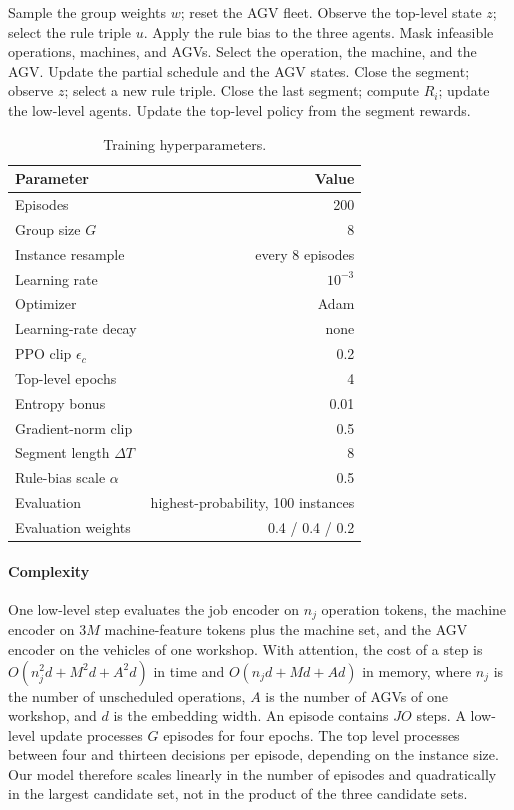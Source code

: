\begin{algorithm}[t]
\caption{One training episode}
\label{alg:train}
\begin{algorithmic}[1]
\State Sample the group weights $w$; reset the AGV fleet.
\State Observe the top-level state $z$; select the rule triple $u$.
    \State Apply the rule bias to the three agents.
    \State Mask infeasible operations, machines, and AGVs.
    \State Select the operation, the machine, and the AGV.
    \State Update the partial schedule and the AGV states.
        \State Close the segment; observe $z$; select a new rule triple.
    \EndIf
\EndFor
\State Close the last segment; compute $R_i$; update the low-level agents.
\State Update the top-level policy from the segment rewards.
\end{algorithmic}
\end{algorithm}

\begin{table}[t]
\centering
\caption{Training hyperparameters.}
\label{tab:hyper}
\begin{tabular}{lr}
\toprule
Parameter & Value \\
\midrule
Episodes & 200 \\
Group size $G$ & 8 \\
Instance resample & every 8 episodes \\
Learning rate & $10^{-3}$ \\
Optimizer & Adam \\
Learning-rate decay & none \\
PPO clip $\epsilon_c$ & 0.2 \\
Top-level epochs & 4 \\
Entropy bonus & 0.01 \\
Gradient-norm clip & 0.5 \\
Segment length $\Delta T$ & 8 \\
Rule-bias scale $\alpha$ & 0.5 \\
Evaluation & highest-probability, 100 instances \\
Evaluation weights & 0.4 / 0.4 / 0.2 \\
\bottomrule
\end{tabular}
\end{table}

\paragraph{Complexity}
One low-level step evaluates the job encoder on $n_j$ operation tokens, the
machine encoder on $3M$ machine-feature tokens plus the machine set, and the
AGV encoder on the vehicles of one workshop. With attention, the cost of a
step is $O(n_j^2 d + M^2 d + A^2 d)$ in time and
$O(n_j d + M d + A d)$ in memory, where $n_j$ is the number of unscheduled
operations, $A$ is the number of AGVs of one workshop, and $d$ is the
embedding width. An
episode contains $JO$ steps. A low-level update processes $G$ episodes for
four epochs. The top level processes between four and thirteen decisions per
episode, depending on the instance size.
Our model therefore scales linearly in the number of episodes and
quadratically in the largest candidate set, not in the product of the three
candidate sets.
